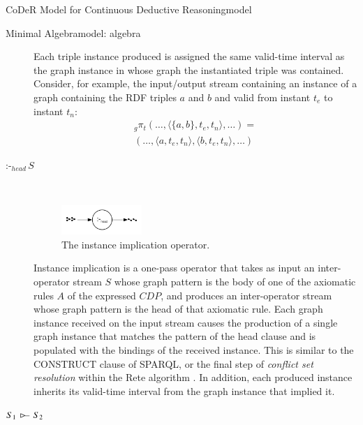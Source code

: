 \begin{nestedsection}{CoDeR Model for Continuous Deductive Reasoning}{model}
\begin{nestedsection}{Minimal Algebra}{model: algebra}
\begin{description}
				Each triple instance produced is assigned the same valid-time interval as the graph instance in whose graph the instantiated triple was contained.
				Consider, for example, the input/output stream containing an instance of a graph containing the RDF triples $a$ and $b$ and valid from instant $t_e$ to instant $t_n$:
				\begin{multline*}
					{}_g{\pi_t} (\dots,\langle \{a,b\},t_e,t_n \rangle,\dots) = \\
						(\dots,\langle a,t_e,t_n \rangle,\langle b,t_e,t_n \rangle,\dots)
				\end{multline*}
			\item[$\text{:-}_{head}\,S$] \hfill \\
				\begin{figure}[b]
					\centering
					\includegraphics[width=0.3\textwidth]{instance-implication}
					\caption{The instance implication operator.}
				\end{figure}
				Instance implication is a one-pass operator that takes as input an inter-operator stream $S$ whose graph pattern is the body of one of the axiomatic rules $A$ of the expressed ${CDP}$, and produces an inter-operator stream whose graph pattern is the head of that axiomatic rule.
				Each graph instance received on the input stream causes the production of a single graph instance that matches the pattern of the head clause and is populated with the bindings of the received instance.
				This is similar to the CONSTRUCT clause of SPARQL, or the final step of \emph{conflict set resolution} within the Rete algorithm \citep{forgy79}.
				In addition, each produced instance inherits its valid-time interval from the graph instance that implied it.
			\item[${S_1\,\rstreamjoin\,S_2}$] \hfill \\
				\begin{figure}[t]
					\centering
					\\

\end{figure}
\end{description}
\end{nestedsection}
\end{nestedsection}
